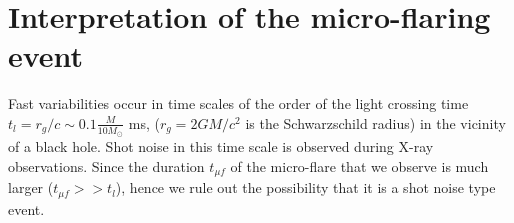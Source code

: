 \documentclass[referee]{cjaa}           %
\begin{document}
\section{Interpretation of the micro-flaring event}
\label{sect:disc}
Fast variabilities occur in time scales of the order of the light
crossing time $t_l = r_g/c \sim 0.1\frac{M}{10M_\odot}$ ms, ($r_g=2GM/c^2$ is the
Schwarzschild radius) in the vicinity of a black hole. Shot noise in this time scale is
observed during X-ray observations. Since the duration $t_{\mu f}$ of the micro-flare
that we observe is much larger ($t_{\mu f}>>t_l$), hence we rule out 
the possibility that it is a shot noise type event. 
                                                                                
\end{document}
